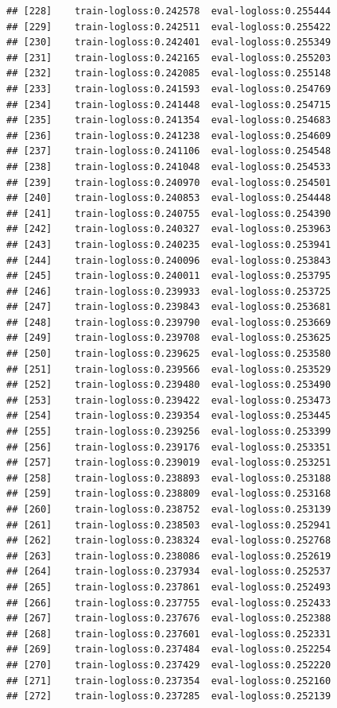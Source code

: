 \documentclass[
]{article}
\begin{document}
\begin{verbatim}
## [228]    train-logloss:0.242578  eval-logloss:0.255444 
## [229]    train-logloss:0.242511  eval-logloss:0.255422 
## [230]    train-logloss:0.242401  eval-logloss:0.255349 
## [231]    train-logloss:0.242165  eval-logloss:0.255203 
## [232]    train-logloss:0.242085  eval-logloss:0.255148 
## [233]    train-logloss:0.241593  eval-logloss:0.254769 
## [234]    train-logloss:0.241448  eval-logloss:0.254715 
## [235]    train-logloss:0.241354  eval-logloss:0.254683 
## [236]    train-logloss:0.241238  eval-logloss:0.254609 
## [237]    train-logloss:0.241106  eval-logloss:0.254548 
## [238]    train-logloss:0.241048  eval-logloss:0.254533 
## [239]    train-logloss:0.240970  eval-logloss:0.254501 
## [240]    train-logloss:0.240853  eval-logloss:0.254448 
## [241]    train-logloss:0.240755  eval-logloss:0.254390 
## [242]    train-logloss:0.240327  eval-logloss:0.253963 
## [243]    train-logloss:0.240235  eval-logloss:0.253941 
## [244]    train-logloss:0.240096  eval-logloss:0.253843 
## [245]    train-logloss:0.240011  eval-logloss:0.253795 
## [246]    train-logloss:0.239933  eval-logloss:0.253725 
## [247]    train-logloss:0.239843  eval-logloss:0.253681 
## [248]    train-logloss:0.239790  eval-logloss:0.253669 
## [249]    train-logloss:0.239708  eval-logloss:0.253625 
## [250]    train-logloss:0.239625  eval-logloss:0.253580 
## [251]    train-logloss:0.239566  eval-logloss:0.253529 
## [252]    train-logloss:0.239480  eval-logloss:0.253490 
## [253]    train-logloss:0.239422  eval-logloss:0.253473 
## [254]    train-logloss:0.239354  eval-logloss:0.253445 
## [255]    train-logloss:0.239256  eval-logloss:0.253399 
## [256]    train-logloss:0.239176  eval-logloss:0.253351 
## [257]    train-logloss:0.239019  eval-logloss:0.253251 
## [258]    train-logloss:0.238893  eval-logloss:0.253188 
## [259]    train-logloss:0.238809  eval-logloss:0.253168 
## [260]    train-logloss:0.238752  eval-logloss:0.253139 
## [261]    train-logloss:0.238503  eval-logloss:0.252941 
## [262]    train-logloss:0.238324  eval-logloss:0.252768 
## [263]    train-logloss:0.238086  eval-logloss:0.252619 
## [264]    train-logloss:0.237934  eval-logloss:0.252537 
## [265]    train-logloss:0.237861  eval-logloss:0.252493 
## [266]    train-logloss:0.237755  eval-logloss:0.252433 
## [267]    train-logloss:0.237676  eval-logloss:0.252388 
## [268]    train-logloss:0.237601  eval-logloss:0.252331 
## [269]    train-logloss:0.237484  eval-logloss:0.252254 
## [270]    train-logloss:0.237429  eval-logloss:0.252220 
## [271]    train-logloss:0.237354  eval-logloss:0.252160 
## [272]    train-logloss:0.237285  eval-logloss:0.252139 

\end{verbatim}
\end{document}
